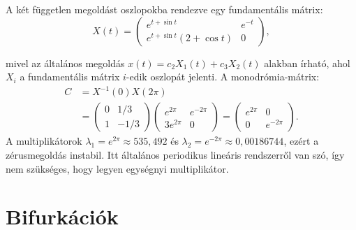 A két független megoldást oszlopokba rendezve egy fundamentális mátrix:
\begin{equation}
X(t)=
\begin{pmatrix}
e^{t+\sin t} &  e^{-t}\\
e^{t+\sin t}\left( 2+\cos t\right) &0
\end{pmatrix},
\end{equation}

mivel az általános megoldás $x(t)=c_2 X_1(t)+c_3 X_2(t)$ alakban írható, ahol $X_i$ a fundamentális mátrix $i$-edik oszlopát jelenti. A monodrómia-mátrix:
\begin{align}
C&=X^{-1}(0)X(2\pi)\\
&=\begin{pmatrix}0&1/3\\1&-1/3\end{pmatrix}
\begin{pmatrix}e^{2\pi}&e^{-2\pi}\\3e^{2\pi}&0\end{pmatrix}
=\begin{pmatrix}e^{2\pi}&0\\0&e^{-2\pi}\end{pmatrix}.
\end{align}
A multiplikátorok $\lambda_1=e^{2\pi}\approx535{,}492$ és $\lambda_2=e^{-2\pi}\approx0{,}00186744$, ezért a zérusmegoldás instabil. Itt általános periodikus lineáris rendszerről van szó, így nem szükséges, hogy legyen egységnyi multiplikátor.
\exampleend

\section{Bifurkációk}


